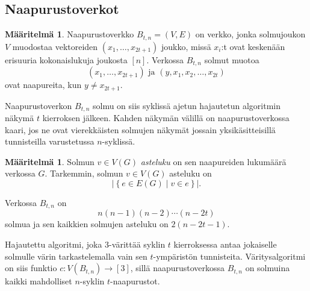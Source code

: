 \documentclass[finnish]{tktltiki2}
\theoremstyle{definition}
\newtheorem{maar}[lau]{Määritelmä}
\theoremstyle{remark}
\newcommand{\set}[1]{\left\{ #1 \right\}}
\newcommand{\from}{\colon}
\begin{document}

\subsection{Naapurustoverkot}

\newcommand{\Btn}{B_{t,n}}
\begin{maar}
    Naapurustoverkko $\Btn = (V,E)$ on verkko, jonka solmujoukon $V$ muodostaa
    vektoreiden $(x_1,\dots,x_{2t+1})$ joukko, missä $x_i$:t ovat keskenään
    erisuuria kokonaislukuja joukosta $[n]$.  Verkossa $B_{t,n}$ solmut muotoa
    \begin{equation*}
        (x_1, \dots, x_{2t+1}) \text{ ja } (y, x_1, x_2, \dots, x_{2t})
    \end{equation*}
    ovat naapureita, kun $y \neq x_{2t+1}$.
\end{maar}

Naapurustoverkon $\Btn$ solmu on siis syklissä ajetun hajautetun algoritmin
näkymä $t$ kierroksen jälkeen. Kahden näkymän välillä on naapurustoverkossa
kaari, jos ne ovat vierekkäisten solmujen näkymät jossain yksikäsitteisillä
tunnisteilla varustetussa $n$-syklissä.

\begin{maar}
    Solmun $v \in V(G)$ \emph{asteluku} on sen naapureiden lukumäärä verkossa
    $G$. Tarkemmin, solmun $v \in V(G)$ asteluku on
    \begin{equation*}
        \bigl|
          \set{e \in E(G) \mid v \in e}
        \bigr|.
    \end{equation*}
\end{maar}

Verkossa $B_{t,n}$ on
%
\begin{equation*}
    n(n-1)(n-2) \cdots (n-2t)
\end{equation*}
%
solmua ja sen kaikkien solmujen asteluku on $2(n-2t-1)$.



Hajautettu algoritmi, joka 3-värittää syklin $t$ kierroksessa antaa jokaiselle
solmulle värin tarkastelemalla vain sen $t$-ympäristön tunnisteita.
Vä\-ri\-tys\-al\-go\-rit\-mi on siis funktio $c \from V(\Btn) \to
[3]$, sillä naapurustoverkossa $\Btn$ on solmuina kaikki mahdolliset $n$-syklin
$t$-naapurustot.
\end{document}
